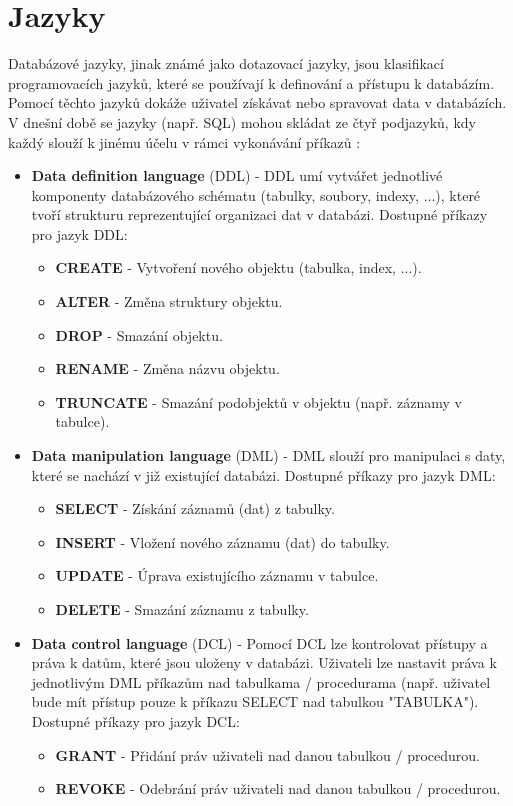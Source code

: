 \section{Jazyky} \label{sec:jazyky}
Databázové jazyky, jinak známé jako dotazovací jazyky, jsou klasifikací programovacích jazyků, které se používají k definování a přístupu k databázím. Pomocí těchto jazyků dokáže uživatel získávat nebo spravovat data v databázích. V dnešní době se jazyky (např. SQL) mohou skládat ze čtyř podjazyků, kdy každý slouží k jinému účelu v rámci vykonávání příkazů \cite{indeedDBLanguage, begginersBookDBLanguage}:
\begin{itemize}
\item \textbf{Data definition language} (DDL) - DDL umí vytvářet jednotlivé komponenty databázového schématu (tabulky, soubory, indexy, ...), které tvoří strukturu reprezentující organizaci dat v databázi. Dostupné příkazy pro jazyk DDL:
	\begin{itemize}
	\item \textbf{CREATE} - Vytvoření nového objektu (tabulka, index, ...).
	\item \textbf{ALTER} - Změna struktury objektu.
	\item \textbf{DROP} - Smazání objektu.
	\item \textbf{RENAME} - Změna názvu objektu.
	\item \textbf{TRUNCATE} - Smazání podobjektů v objektu (např. záznamy v tabulce).
	\end{itemize}
\item \textbf{Data manipulation language} (DML) - DML slouží pro manipulaci s daty, které se nachází v již existující databázi. Dostupné příkazy pro jazyk DML:
	\begin{itemize}
	\item \textbf{SELECT} - Získání záznamů (dat) z tabulky.
	\item \textbf{INSERT} - Vložení nového záznamu (dat) do tabulky.
	\item \textbf{UPDATE} - Úprava existujícího záznamu v tabulce.
	\item \textbf{DELETE} - Smazání záznamu z tabulky.
	\end{itemize}
\item \textbf{Data control language} (DCL) - Pomocí DCL lze kontrolovat přístupy a práva k datům, které jsou uloženy v databázi. Uživateli lze nastavit práva k jednotlivým DML příkazům nad tabulkama / procedurama (např. uživatel bude mít přístup pouze k příkazu SELECT nad tabulkou "TABULKA"). Dostupné příkazy pro jazyk DCL:
	\begin{itemize}
	\item \textbf{GRANT} - Přidání práv uživateli nad danou tabulkou / procedurou. 
	\item \textbf{REVOKE} - Odebrání práv uživateli nad danou tabulkou / procedurou.
	\end{itemize}


\end{itemize}
